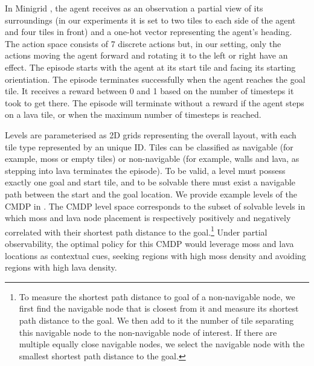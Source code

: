 In Minigrid \cite{gym_minigrid}, the agent receives as an observation a partial view of its surroundings (in our experiments it is set to two tiles to each side of the agent and four tiles in front) and a one-hot vector representing the agent's heading. The action space consists of 7 discrete actions but, in our setting, only the actions moving the agent forward and rotating it to the left or right have an effect. The episode starts with the agent at its start tile and facing its starting orientiation. The episode terminates successfully when the agent reaches the goal tile. It receives a reward between 0 and 1 based on the number of timesteps it took to get there. The episode will terminate without a reward if the agent steps on a lava tile, or when the maximum number of timesteps is reached.

Levels are parameterised as 2D grids representing the overall layout, with each tile type represented by an unique ID. Tiles can be classified as navigable (for example, moss or empty tiles) or non-navigable (for example, walls and lava, as stepping into lava terminates the episode). To be valid, a level must possess exactly one goal and start tile, and to be solvable there must exist a navigable path between the start and the goal location.
We provide example levels of the CMDP in . The CMDP level space corresponds to the subset of solvable levels in which moss and lava node placement is respectively positively and negatively correlated with their shortest path distance to the goal.\footnote{To measure the shortest path distance to goal of a non-navigable node, we first find the navigable node that is closest from it and measure its shortest path distance to the goal. We then add to it the number of tile separating this navigable node to the non-navigable node of interest. If there are multiple equally close navigable nodes, we select the navigable node with the smallest shortest path distance to the goal.} Under partial observability, the optimal policy for this CMDP would leverage moss and lava locations as contextual cues, seeking regions with high moss density and avoiding regions with high lava density. 

